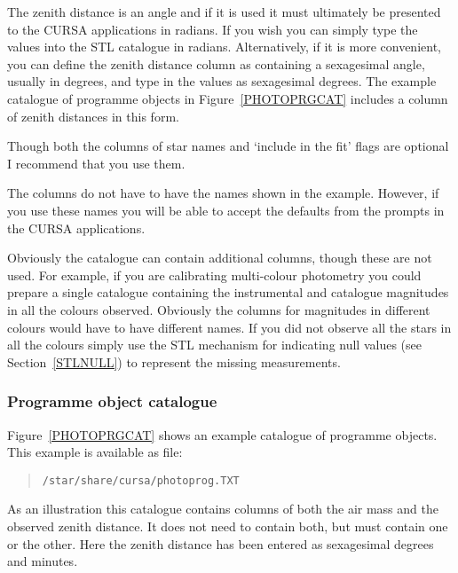 \documentclass[twoside,11pt]{article}
\renewcommand{\_}{\texttt{\symbol{95}}}
\begin{document}
The zenith distance is an angle and if it is used it must ultimately
be presented to the CURSA applications in radians.  If you wish you
can simply type the values into the STL catalogue in radians.
Alternatively, if it is more convenient, you can define the zenith
distance column as containing a sexagesimal angle, usually in degrees,
and type in the values as sexagesimal degrees.  The example catalogue
of programme objects in Figure~\ref{PHOTOPRGCAT} includes a column of
zenith distances in this form.

Though both the columns of star names and `include in the fit' flags
are optional I recommend that you use them.

The columns do not have to have the names shown in the example.
However, if you use these names you will be able to accept the defaults
from the prompts in the CURSA applications.

Obviously the catalogue can contain additional columns, though these
are not used.  For example, if you are calibrating multi-colour photometry
you could prepare a single catalogue containing the instrumental and
catalogue magnitudes in all the colours observed.  Obviously the
columns for magnitudes in different colours would have to have different
names.  If you did not observe all the stars in all the colours simply
use the STL mechanism for indicating null values (see
Section~\ref{STLNULL}) to represent the missing measurements.

\subsubsection{Programme object catalogue}

Figure~\ref{PHOTOPRGCAT} shows an example catalogue of programme
objects.  This example is available as file:

\begin{verse}
{\tt /star/share/cursa/photoprog.TXT}
\end{verse}

As an illustration this catalogue contains columns of both the air mass
and the observed zenith distance.  It does not need to contain both,
but must contain one or the other.  Here the zenith distance has been
entered as sexagesimal degrees and minutes.
\end{document}
